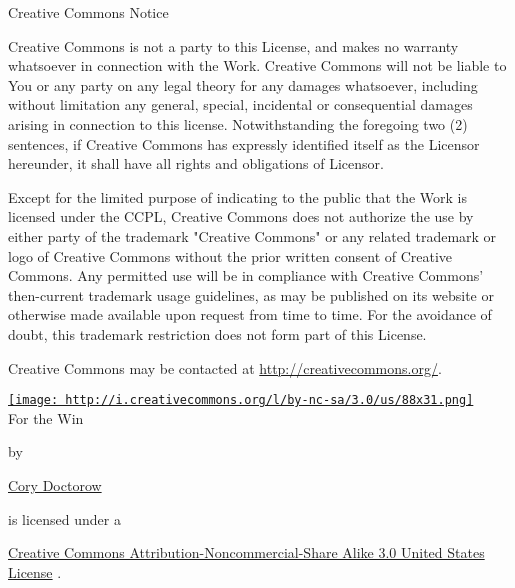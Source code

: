 Creative Commons Notice

Creative Commons is not a party to this License, and makes no
warranty whatsoever in connection with the Work. Creative Commons
will not be liable to You or any party on any legal theory for any
damages whatsoever, including without limitation any general,
special, incidental or consequential damages arising in connection
to this license. Notwithstanding the foregoing two (2) sentences,
if Creative Commons has expressly identified itself as the Licensor
hereunder, it shall have all rights and obligations of Licensor.

Except for the limited purpose of indicating to the public that the
Work is licensed under the CCPL, Creative Commons does not
authorize the use by either party of the trademark "Creative
Commons" or any related trademark or logo of Creative Commons
without the prior written consent of Creative Commons. Any
permitted use will be in compliance with Creative Commons'
then-current trademark usage guidelines, as may be published on its
website or otherwise made available upon request from time to time.
For the avoidance of doubt, this trademark restriction does not
form part of this License.

Creative Commons may be contacted at
\href{http://creativecommons.org/}{http://creativecommons.org/}.

\href{http://creativecommons.org/licenses/by-nc-sa/3.0/us/}{\texttt{[image: http://i.creativecommons.org/l/by-nc-sa/3.0/us/88x31.png]}}\\
For the Win

by

\href{http://craphound.com/ftw}{Cory Doctorow}

is licensed under a

\href{http://creativecommons.org/licenses/by-nc-sa/3.0/us/}{Creative Commons Attribution-Noncommercial-Share Alike 3.0 United States License}
.

